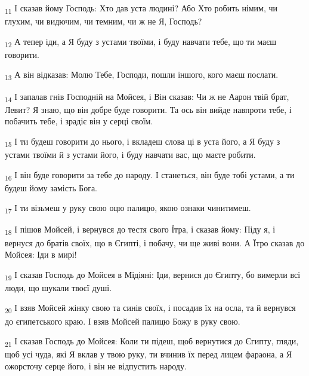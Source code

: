 \begin{tcolorbox}
\textsubscript{11} І сказав йому Господь: Хто дав уста людині? Або Хто робить німим, чи глухим, чи видючим, чи темним, чи ж не Я, Господь?
\end{tcolorbox}
\begin{tcolorbox}
\textsubscript{12} А тепер іди, а Я буду з устами твоїми, і буду навчати тебе, що ти маєш говорити.
\end{tcolorbox}
\begin{tcolorbox}
\textsubscript{13} А він відказав: Молю Тебе, Господи, пошли іншого, кого маєш послати.
\end{tcolorbox}
\begin{tcolorbox}
\textsubscript{14} І запалав гнів Господній на Мойсея, і Він сказав: Чи ж не Аарон твій брат, Левит? Я знаю, що він добре буде говорити. Та ось він вийде навпроти тебе, і побачить тебе, і зрадіє він у серці своїм.
\end{tcolorbox}
\begin{tcolorbox}
\textsubscript{15} І ти будеш говорити до нього, і вкладеш слова ці в уста його, а Я буду з устами твоїми й з устами його, і буду навчати вас, що маєте робити.
\end{tcolorbox}
\begin{tcolorbox}
\textsubscript{16} І він буде говорити за тебе до народу. І станеться, він буде тобі устами, а ти будеш йому замість Бога.
\end{tcolorbox}
\begin{tcolorbox}
\textsubscript{17} І ти візьмеш у руку свою оцю палицю, якою ознаки чинитимеш.
\end{tcolorbox}
\begin{tcolorbox}
\textsubscript{18} І пішов Мойсей, і вернувся до тестя свого Їтра, і сказав йому: Піду я, і вернуся до братів своїх, що в Єгипті, і побачу, чи ще живі вони. А Їтро сказав до Мойсея: Іди в мирі!
\end{tcolorbox}
\begin{tcolorbox}
\textsubscript{19} І сказав Господь до Мойсея в Мідіяні: Іди, вернися до Єгипту, бо вимерли всі люди, що шукали твоєї душі.
\end{tcolorbox}
\begin{tcolorbox}
\textsubscript{20} І взяв Мойсей жінку свою та синів своїх, і посадив їх на осла, та й вернувся до єгипетського краю. І взяв Мойсей палицю Божу в руку свою.
\end{tcolorbox}
\begin{tcolorbox}
\textsubscript{21} І сказав Господь до Мойсея: Коли ти підеш, щоб вернутися до Єгипту, гляди, щоб усі чуда, які Я вклав у твою руку, ти вчинив їх перед лицем фараона, а Я ожорсточу серце його, і він не відпустить народу.
\end{tcolorbox}
